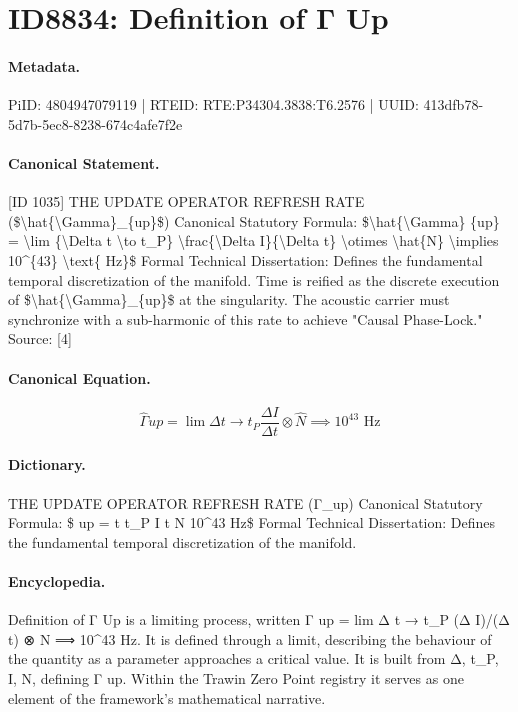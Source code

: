 \section*{ID8834: Definition of Γ Up}
\paragraph{Metadata.}
PiID: 4804947079119 | RTEID: RTE:P34304.3838:T6.2576 | UUID: 413dfb78-5d7b-5ec8-8238-674c4afe7f2e

\paragraph{Canonical Statement.}
[ID 1035] THE UPDATE OPERATOR REFRESH RATE (\$\textbackslash{}hat\{\textbackslash{}Gamma\}\_\{up\}\$) Canonical Statutory Formula: \$\textbackslash{}hat\{\textbackslash{}Gamma\} \{up\} = \textbackslash{}lim \{\textbackslash{}Delta t \textbackslash{}to t\_P\} \textbackslash{}frac\{\textbackslash{}Delta I\}\{\textbackslash{}Delta t\} \textbackslash{}otimes \textbackslash{}hat\{N\} \textbackslash{}implies 10\textasciicircum{}\{43\} \textbackslash{}text\{ Hz\}\$ Formal Technical Dissertation: Defines the fundamental temporal discretization of the manifold. Time is reified as the discrete execution of \$\textbackslash{}hat\{\textbackslash{}Gamma\}\_\{up\}\$ at the singularity. The acoustic carrier must synchronize with a sub-harmonic of this rate to achieve "Causal Phase-Lock." Source: [4]

\paragraph{Canonical Equation.}
\[
\hat{\Gamma} {up} = \lim {\Delta t \to t_P} \frac{\Delta I}{\Delta t} \otimes \hat{N} \implies 10^{43} \text{ Hz}
\]

\paragraph{Dictionary.}
THE UPDATE OPERATOR REFRESH RATE (Γ\_up) Canonical Statutory Formula: \$ up = t t\_P I t N 10\textasciicircum{}43 Hz\$ Formal Technical Dissertation: Defines the fundamental temporal discretization of the manifold.

\paragraph{Encyclopedia.}
Definition of Γ Up is a limiting process, written Γ up = lim Δ t → t\_P (Δ I)/(Δ t) ⊗ N ⟹ 10\textasciicircum{}43 Hz. It is defined through a limit, describing the behaviour of the quantity as a parameter approaches a critical value. It is built from Δ, t\_P, I, N, defining Γ up. Within the Trawin Zero Point registry it serves as one element of the framework's mathematical narrative.
